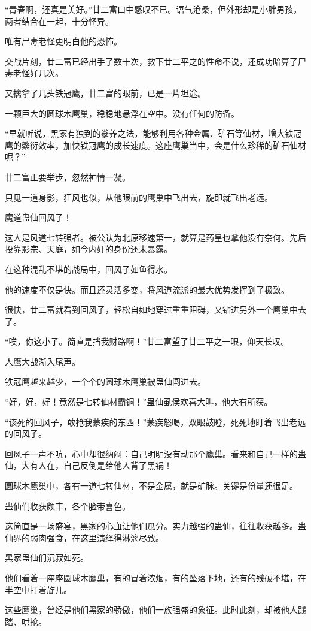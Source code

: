 \begin{this_body}
“青春啊，还真是美好。”廿二富口中感叹不已。语气沧桑，但外形却是小胖男孩，两者结合在一起，十分怪异。

唯有尸毒老怪更明白他的恐怖。

交战片刻，廿二富已经出手了数十次，救下廿二平之的性命不说，还成功暗算了尸毒老怪好几次。

又擒拿了几头铁冠鹰，廿二富的眼前，已是一片坦途。

一颗巨大的圆球木鹰巢，稳稳地悬浮在空中。没有任何的防备。

“早就听说，黑家有独到的豢养之法，能够利用各种金属、矿石等仙材，增大铁冠鹰的繁衍效率，加快铁冠鹰的成长速度。这座鹰巢当中，会是什么珍稀的矿石仙材呢？”

廿二富正要举步，忽然神情一凝。

只见一道身影，狂风也似，从他眼前的鹰巢中飞出去，旋即就飞出老远。

魔道蛊仙回风子！

这人是风道七转强者。被公认为北原移速第一，就算是药皇也拿他没有奈何。先后投靠影宗、天庭，如今内奸的身份还未暴露。

在这种混乱不堪的战局中，回风子如鱼得水。

他的速度不仅是快。而且还灵活多变，将风道流派的最大优势发挥到了极致。

很快，廿二富就看到回风子，轻松自如地穿过重重阻碍，又钻进另外一个鹰巢中去了。

“唉，你这小子。简直是挡我财路啊！”廿二富望了廿二平之一眼，仰天长叹。

人鹰大战渐入尾声。

铁冠鹰越来越少，一个个的圆球木鹰巢被蛊仙闯进去。

“好，好，好！竟然是七转仙材霸铜！”蛊仙虱侯欢喜大叫，他大有所获。

“该死的回风子，敢抢我蒙疾的东西！”蒙疾怒喝，双眼鼓瞪，死死地盯着飞出老远的回风子。

回风子一声不吭，心中却很纳闷：自己明明没有动那个鹰巢。看来和自己一样的蛊仙，大有人在，自己反倒是给他人背了黑锅！

圆球木鹰巢中，各有一道七转仙材，不是金属，就是矿脉。关键是份量还很足。

蛊仙们收获颇丰，各个脸带喜色。

这简直是一场盛宴，黑家的心血让他们瓜分。实力越强的蛊仙，往往收获越多。蛊仙界的弱肉强食，在这里演绎得淋漓尽致。

黑家蛊仙们沉寂如死。

他们看着一座座圆球木鹰巢，有的冒着浓烟，有的坠落下地，还有的残破不堪，在半空中打着旋儿。

这些鹰巢，曾经是他们黑家的骄傲，他们一族强盛的象征。此时此刻，却被他人践踏、哄抢。


\end{this_body}
